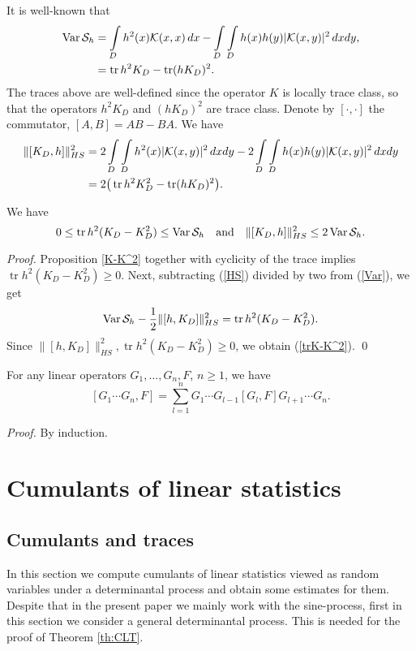 \documentclass{article}
\numberwithin{equation}{section}
\newcommand{\SSS}{{\cal S}}
\newcommand{\KK}{{\cal K}}
\newcommand{\tr}{\operatorname{tr}}
\newcommand{\Var}{\operatorname{Var}}
\newcommand{\ssk}{\smallskip}
\newcommand{\fr}{\frac}
\newcommand{\qmb}{\quad\mbox}
\newcommand{\qu}{\quad}
\newcommand{\sli}{\sum\limits}
\newcommand{\ili}{\int\limits}
\newcommand{\lbl}{\label}
\newcommand{\rprop}{Proposition \nolinebreak}
\newcommand{\bee}{\begin{equation}}
\newcommand{\eee}{\end{equation}}
\newcommand{\bpp}{\begin{prop}}
\newcommand{\epp}{\end{prop}}
\newcommand{\non}{\nonumber}
\begin{document}
\ssk
It is well-known that
\begin{align}\non
\Var \SSS_h&=\ili_D h^2(x)\KK(x,x)\,dx
- \ili_D\ili_D h(x)h(y)|\KK(x,y)|^2\, dx dy, \\ \lbl{Var}
&=\tr h^2 K_D - \tr (h K_D)^2.
\end{align}
The traces above are well-defined since the operator $K$ is locally trace class,
so that the operators $h^2 K_D$ and $(h K_D)^2$ are trace class.
Denote by $[\cdot,\cdot]$ the commutator,
$[A,B]=AB-BA$.
We have
\begin{align}\non
\|[K_D,h]\|_{HS}^2&=2\ili_D\ili_D h^2(x)|\KK(x,y)|^2\, dx dy
- 2\ili_D\ili_D h(x)h(y)|\KK(x,y)|^2\, dxdy \\ \lbl{HS}
&= 2\big(\tr h^2 K_D^2 - \tr(h K_D)^2 \big).
\end{align}
\bpp
We have
\bee\lbl{trK-K^2}
0\leq \tr h^2(K_D-K_D^2) \leq \Var\SSS_{h}
\qmb{and}\qu
\|[K_D,h]\|_{HS}^2\leq 2\Var \SSS_h.
\eee
\epp
{\it Proof.}
\rprop\ref{K-K^2} together with cyclicity of the trace implies $\tr h^2(K_D-K_D^2)\geq 0$.
Next, subtracting (\ref{HS}) divided by two from (\ref{Var}), we get
$$
\Var \SSS_h - \fr12\|[h,K_D]\|_{HS}^2 = \tr h^2(K_D-K_D^2).
$$
Since $\|[h,K_D]\|_{HS}^2, \tr h^2(K_D-K_D^2)\geq 0$, we obtain (\ref{trK-K^2}).
\qed

\bpp\lbl{lem:[]}
For any linear operators $G_1,\ldots,G_n, F$, $n\geq 1$, we have
$$
[G_1\cdots G_n,F]=\sli_{l=1}^n G_1\cdots G_{l-1}[G_l,F]G_{l+1}\cdots G_n.
$$
\epp
{\it Proof.} By induction.
%
%
%
%
%

\section{Cumulants of linear statistics}
\lbl{sec:cumulants}

\subsection{Cumulants and traces}

In this section we
compute cumulants of linear statistics
viewed as random variables
under a determinantal process and obtain some estimates for them.
Despite that in the present paper we mainly work with the sine-process,
first in this section we consider a general determinantal process.
This is needed for the proof of Theorem \ref{th:CLT}.
\end{document}
